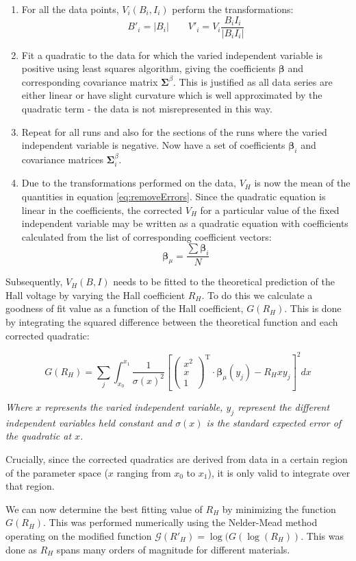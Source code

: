 \documentclass{article}
\begin{document}
		\begin{enumerate}
			\item For all the data points, $V_i(B_i,I_i)$ perform the transformations:
			\[B'_i = |B_i| \qquad V'_i = V_i\frac{B_iI_i}{|B_iI_i|}\]
			\item Fit a quadratic to the data for which the varied independent variable is positive using least squares algorithm, giving the coefficients $\boldsymbol{\beta}$ and corresponding covariance matrix $\boldsymbol{\Sigma}^\beta$. This is justified as all data series are either linear or have slight curvature which is well approximated by the quadratic term - the data is not misrepresented in this way.
			\item Repeat for all runs and also for the sections of the runs where the varied independent variable is negative. Now have a set of coefficients $\boldsymbol{\beta}_i$ and covariance matrices $\boldsymbol{\Sigma}^\beta_i$.
			\item Due to the transformations performed on the data, $V_H$ is now the mean of the quantities in equation \ref{eq:removeErrors}. Since the quadratic equation is linear in the coefficients, the corrected $V_H$ for a particular value of the fixed independent variable may be written as a quadratic equation with coefficients calculated from the list of corresponding coefficient vectors:
			\[ \boldsymbol{\beta}_\mu = \frac{\sum\boldsymbol{\beta}_i}{N} \]
		\end{enumerate}
		
		\noindent Subsequently, $V_H(B,I)$ needs to be fitted to the theoretical prediction of the Hall voltage by varying the Hall coefficient $R_H$. To do this we calculate a goodness of fit value as a function of the Hall coefficient, $G(R_H)$. This is done by integrating the squared difference between the theoretical function and each corrected quadratic:
		
		\[ G(R_H) = \sum_j\int_{x_0}^{x_1}\frac{1}{\sigma(x)^2}\left[\begin{pmatrix} x^2 \\ x \\ 1\end{pmatrix}^\mathrm{T}\cdot\boldsymbol{\beta}_\mu(y_j) - R_Hxy_j\right]^2 dx \]
		\begin{center}\emph{Where $x$ represents the varied independent variable, $y_j$ represent the different independent variables held constant and $\sigma(x)$ is the standard expected error of the quadratic at $x$.}\end{center}
		
		\noindent Crucially, since the corrected quadratics are derived from data in a certain region of the parameter space ($x$ ranging from $x_0$ to $x_1$), it is only valid to integrate over that region.
		
		We can now determine the best fitting value of $R_H$ by minimizing the function $G(R_H)$. This was performed numerically using the Nelder-Mead method operating on the modified function $\mathcal{G}(R'_H) = \log(G(\log(R_H))$. This was done as $R_H$ spans many orders of magnitude for different materials.
		
\end{document}
